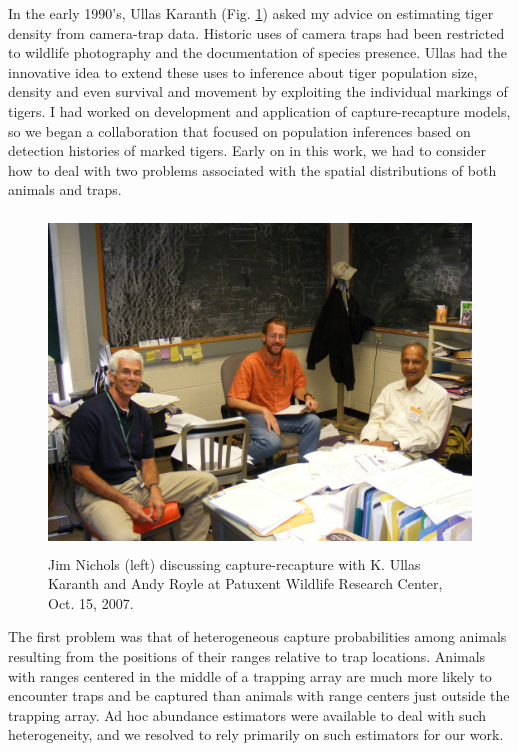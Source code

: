 In the early 1990's, Ullas Karanth (Fig. \ref{fig.karanth})
asked my advice on estimating tiger
density from camera-trap data. Historic uses of camera traps had been
restricted to wildlife photography and the documentation of species
presence. Ullas had the innovative idea to extend these uses to
inference about tiger population size, density and even survival and
movement by exploiting the individual markings of tigers.  I had
worked on development and application of capture-recapture models, so
we began a collaboration that focused on population inferences based
on detection histories of marked tigers. Early on in this work, we had
to consider how to deal with two problems associated with the spatial
distributions of both animals and traps.


\begin{figure}[h!]
\centering
\includegraphics[height=3.5in]{Ch0-Foreword/Nichols_etal.jpg}
\caption{
Jim Nichols (left) discussing capture-recapture with K. Ullas Karanth
and Andy Royle at Patuxent Wildlife Research Center, 
Oct. 15, 2007. 
}
\label{fig.karanth}
\end{figure}

The first problem was that of heterogeneous capture probabilities
among animals resulting from the positions of their ranges relative to
trap locations. Animals with ranges centered in the middle of a
trapping array are much more likely to encounter traps and be captured
than animals with range centers just outside the trapping array. Ad
hoc abundance estimators were available to deal with such
heterogeneity, and we resolved to rely primarily on such estimators
for our work.  


